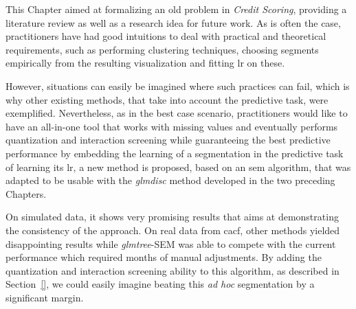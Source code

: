 \bigskip

This Chapter aimed at formalizing an old problem in \textit{Credit Scoring}, providing a literature review as well as a research idea for future work. As is often the case, practitioners have had good intuitions to deal with practical and theoretical requirements, such as performing clustering techniques, choosing segments empirically from the resulting visualization and fitting \gls{lr} on these.

However, situations can easily be imagined where such practices can fail, which is why other existing methods, that take into account the predictive task, were exemplified. Nevertheless, as in the best case scenario, practitioners would like to have an all-in-one tool that works with missing values and eventually performs quantization and interaction screening while guaranteeing the best predictive performance by embedding the learning of a segmentation in the predictive task of learning its \gls{lr}, a new method is proposed, based on an \gls{sem} algorithm, that was adapted to be usable with the \textit{glmdisc} method developed in the two preceding Chapters.

On simulated data, it shows very promising results that aims at demonstrating the consistency of the approach. On real data from \gls{cacf}, other methods yielded disappointing results while \textit{glmtree}-SEM was able to compete with the current performance which required months of manual adjustments. By adding the quantization and interaction screening ability to this algorithm, as described in Section~\ref{}, we could easily imagine beating this \textit{ad hoc} segmentation by a significant margin.

\printbibliography[heading=subbibliography, title=References of Chapter 5]

